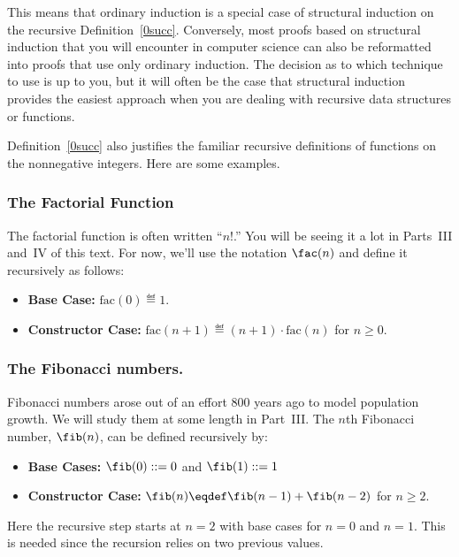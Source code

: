 This means that ordinary induction is a special case of structural
induction on the recursive Definition~\ref{0succ}. Conversely, most
proofs based on structural induction that you will encounter in
computer science can also be reformatted into proofs that use only
ordinary induction.  The decision as to which technique to use is up
to you, but it will often be the case that structural induction
provides the easiest approach when you are dealing with recursive data
structures or functions.

Definition~\ref{0succ} also justifies 
the familiar recursive definitions of functions on the nonnegative
integers.  Here are some examples.

\subsubsection{The Factorial Function}

The factorial function is often written ``$n!$.''  You will be seeing
it a lot in Parts~III and~IV of this text. For now, we'll use the
notation $\fac(n)$ and define it recursively as follows:
\begin{itemize}

\item\textbf{Base Case:} $\text{fac}(0) \eqdef 1$.

\item\textbf{Constructor Case:}
$\text{fac}(n+1) \eqdef (n+1)\cdot \text{fac}(n)$ for $n \ge 0$.

\end{itemize}

\subsubsection{The Fibonacci numbers.}

Fibonacci numbers arose out of an effort 800 years ago to model
population growth.  We will study them at some length in Part~III\@.
The $n$th Fibonacci number, $\fib(n)$, can be defined recursively
by:
\begin{itemize}

\item\textbf{Base Cases:}
$\fib(0) ::= 0$ and $\fib(1) ::= 1$

\item\textbf{Constructor Case:}
$\fib(n) \eqdef \fib(n-1) + \fib(n-2)$ for $n \geq 2$.
\end{itemize}
Here the recursive step starts at $n=2$ with base cases for $n = 0$
and $n = 1$.  This
is needed since the recursion relies on two previous values.

